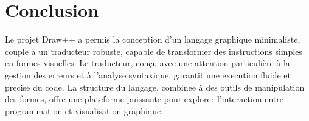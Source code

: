\documentclass[12pt,a4paper]{report}
\begin{document}
 \chapter{Conclusion}

Le projet Draw++ a permis la conception d'un langage graphique minimaliste, couple à un traducteur robuste, capable de transformer des instructions simples en formes visuelles. Le traducteur, conçu avec une attention particulière à la gestion des erreurs et à l’analyse syntaxique, garantit une execution fluide et precise du code. La structure du langage, combinee à des outils de manipulation des formes, offre une plateforme puissante pour explorer l'interaction entre programmation et visualisation graphique.
\end{document}
